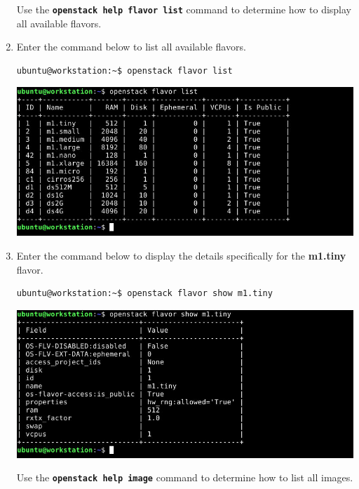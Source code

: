 \documentclass[letterpaper, 12pt]{article}
\begin{document}
\begin{enumerate}
    \begin{tipbox}{}
        Use the \textbf{\texttt{openstack help flavor list}} command to determine how to display all available flavors.
    \end{tipbox}

    \item Enter the command below to list all available flavors.
\begin{lstlisting}
ubuntu@workstation:~$ openstack flavor list
\end{lstlisting}

    \begin{center}
        \includegraphics[width=\linewidth]{images/part2/step8.png}
    \end{center}

    \item Enter the command below to display the details specifically for the \textbf{m1.tiny} flavor.
\begin{lstlisting}
ubuntu@workstation:~$ openstack flavor show m1.tiny
\end{lstlisting}

    \begin{center}
        \includegraphics[width=\linewidth]{images/part2/step9.png}
    \end{center}

    \begin{tipbox}{}
        Use the \textbf{\texttt{openstack help image}} command to determine how to list all images.
    \end{tipbox}


\end{enumerate}
\end{document}
